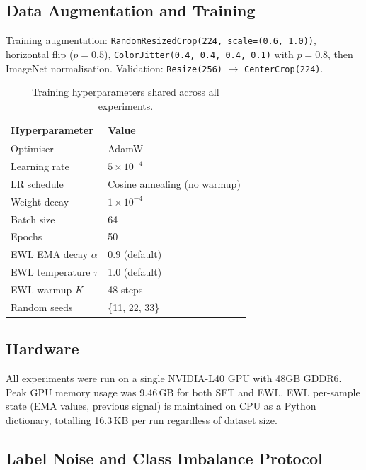 \subsection{Data Augmentation and Training}

Training augmentation: \texttt{RandomResizedCrop(224, scale=(0.6, 1.0))},
horizontal flip ($p{=}0.5$), \texttt{ColorJitter(0.4, 0.4, 0.4, 0.1)} with
$p{=}0.8$, then ImageNet normalisation.
Validation: \texttt{Resize(256)} $\to$ \texttt{CenterCrop(224)}.

\begin{table}[h]
  \centering
  \caption{Training hyperparameters shared across all experiments.}
  \label{tab:train_config}
  \begin{tabular}{ll}
    \toprule
    \textbf{Hyperparameter} & \textbf{Value} \\
    \midrule
    Optimiser               & AdamW~\cite{loshchilov2019adamw} \\
    Learning rate           & $5 \times 10^{-4}$ \\
    LR schedule             & Cosine annealing (no warmup) \\
    Weight decay            & $1 \times 10^{-4}$ \\
    Batch size              & 64 \\
    Epochs                  & 50 \\
    EWL EMA decay $\alpha$  & 0.9 (default) \\
    EWL temperature $\tau$  & 1.0 (default) \\
    EWL warmup $K$          & 48 steps \\
    Random seeds            & \{11, 22, 33\} \\
    \bottomrule
  \end{tabular}
\end{table}

\subsection{Hardware}

All experiments were run on a single NVIDIA-L40 GPU with 48GB GDDR6.
Peak GPU memory usage was 9.46\,GB for both SFT and EWL.
EWL per-sample state (EMA values, previous signal) is maintained on CPU as a
Python dictionary, totalling 16.3\,KB per run regardless of dataset size.

\subsection{Label Noise and Class Imbalance Protocol}

